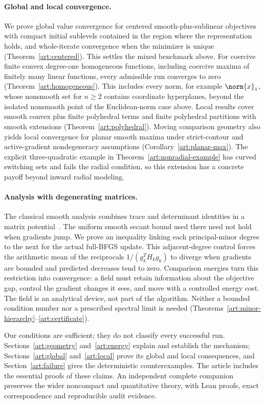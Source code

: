 \paragraph{Global and local convergence.}
We prove global value convergence for centered smooth-plus-sublinear
objectives with compact initial sublevels contained in the region where the
representation holds, and whole-iterate convergence when
the minimizer is unique (Theorem~\ref{art:centered}). This settles the mixed
benchmark above. For coercive finite convex degree-one homogeneous functions,
including coercive maxima of finitely many linear functions, every admissible
run converges to zero (Theorem~\ref{art:homogeneous}). This includes every
norm, for example $\norm{x}_1$, whose nonsmooth set for $n\ge2$ contains
coordinate hyperplanes, beyond the isolated nonsmooth point of the
Euclidean-norm case above. Local results
cover smooth convex plus finite polyhedral terms and finite polyhedral
partitions with smooth extensions (Theorem~\ref{art:polyhedral}). Moving
comparison geometry also yields local convergence for planar smooth maxima
under strict-contour and active-gradient nondegeneracy assumptions
(Corollary~\ref{art:planar-max}). The explicit three-quadratic example in
Theorem~\ref{art:nonradial-example} has curved switching sets and fails the radial
condition, so this extension has a concrete payoff beyond inward radial
modeling.

\paragraph{Analysis with degenerating matrices.}
The classical smooth analysis combines trace and determinant identities in
a matrix potential~\cite[Section~5]{FND_N92}. The uniform smooth secant bound
used there need not hold when gradients jump. We prove an inequality linking
each principal-minor degree to the next for the actual full-BFGS update.
This adjacent-degree control forces the arithmetic mean of the reciprocals
$1/(g_k^TH_kg_k)$ to diverge when gradients are bounded and predicted
decreases tend to zero. Comparison energies turn this restriction into convergence:
a field must retain information about the objective gap, control the gradient
changes it sees, and move with a controlled energy cost. The field is an
analytical device, not part of the algorithm. Neither a bounded condition
number nor a prescribed spectral limit is needed
(Theorems~\ref{art:minor-hierarchy}--\ref{art:certificate}).

Our conditions are sufficient; they do not classify every successful run.
Sections~\ref{art:geometry}
and~\ref{art:energy} explain and establish the mechanism;
Sections~\ref{art:global} and~\ref{art:local} prove its global and local
consequences, and Section~\ref{art:failure} gives the deterministic
counterexamples. The article includes the essential proofs of these claims.
An independent complete companion preserves the wider noncompact and
quantitative theory, with Lean proofs, exact correspondence and reproducible
audit evidence.

